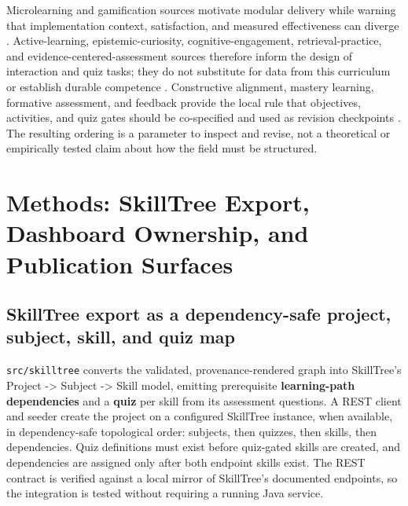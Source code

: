 \documentclass[
  english,
]{article}
\begin{document}
Microlearning and gamification sources motivate modular delivery while
warning that implementation context, satisfaction, and measured
effectiveness can diverge
\citep{septiani2021gamified_microlearning, monib2024microlearning_boundaries, rof2024microlearning_satisfaction}.
Active-learning, epistemic-curiosity, cognitive-engagement,
retrieval-practice, and evidence-centered-assessment sources therefore
inform the design of interaction and quiz tasks; they do not substitute
for data from this curriculum or establish durable competence
\citep{freeman2014activelearning, emin2026epistemic_curiosity_mind_wandering, chi2014icap, roediger2006testenhanced, mislevy2003ecd}.
Constructive alignment, mastery learning, formative assessment, and
feedback provide the local rule that objectives, activities, and quiz
gates should be co-specified and used as revision checkpoints
\citep{biggs1996constructive_alignment, bloom1968learning_for_mastery, black1998assessment, shute2008formative_feedback}.
The resulting ordering is a parameter to inspect and revise, not a
theoretical or empirically tested claim about how the field must be
structured.

\newpage

\section{Methods: SkillTree Export, Dashboard Ownership, and Publication
Surfaces}\label{sec:methodology-skilltree-dashboard-publication}

\subsection{SkillTree export as a dependency-safe project, subject,
skill, and quiz
map}\label{skilltree-export-as-a-dependency-safe-project-subject-skill-and-quiz-map}

\texttt{src/skilltree} converts the validated, provenance-rendered graph
into SkillTree's Project -\textgreater{} Subject -\textgreater{} Skill
model, emitting prerequisite \textbf{learning-path dependencies} and a
\textbf{quiz} per skill from its assessment questions. A REST client and
seeder create the project on a configured SkillTree instance, when
available, in dependency-safe topological order: subjects, then quizzes,
then skills, then dependencies. Quiz definitions must exist before
quiz-gated skills are created, and dependencies are assigned only after
both endpoint skills exist. The REST contract is verified against a
local  mirror of SkillTree's documented
endpoints, so the integration is tested without requiring a running Java
service.
\end{document}
